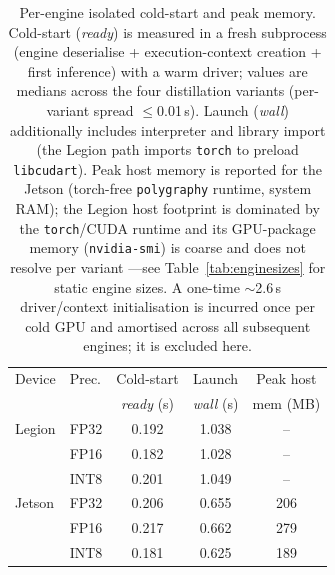 \begin{table}[t]
\centering
\caption{Per-engine isolated cold-start and peak memory. Cold-start (\emph{ready}) is measured in a fresh subprocess (engine deserialise + execution-context creation + first inference) with a warm driver; values are medians across the four distillation variants (per-variant spread $\leq$0.01\,s). Launch (\emph{wall}) additionally includes interpreter and library import (the Legion path imports \texttt{torch} to preload \texttt{libcudart}). Peak host memory is reported for the Jetson (torch-free \texttt{polygraphy} runtime, system RAM); the Legion host footprint is dominated by the \texttt{torch}/CUDA runtime and its GPU-package memory (\texttt{nvidia-smi}) is coarse and does not resolve per variant ---see Table~\ref{tab:enginesizes} for static engine sizes. A one-time $\sim$2.6\,s driver/context initialisation is incurred once per cold GPU and amortised across all subsequent engines; it is excluded here.}
\label{tab:mem}
\begin{tabular}{llccc}
\toprule
Device & Prec. & Cold-start & Launch & Peak host \\
 & & \emph{ready} (s) & \emph{wall} (s) & mem (MB) \\
\midrule
Legion & FP32 & 0.192 & 1.038 & -- \\
 & FP16 & 0.182 & 1.028 & -- \\
 & INT8 & 0.201 & 1.049 & -- \\
\midrule
Jetson & FP32 & 0.206 & 0.655 & 206 \\
 & FP16 & 0.217 & 0.662 & 279 \\
 & INT8 & 0.181 & 0.625 & 189 \\
\bottomrule
\end{tabular}
\end{table}
